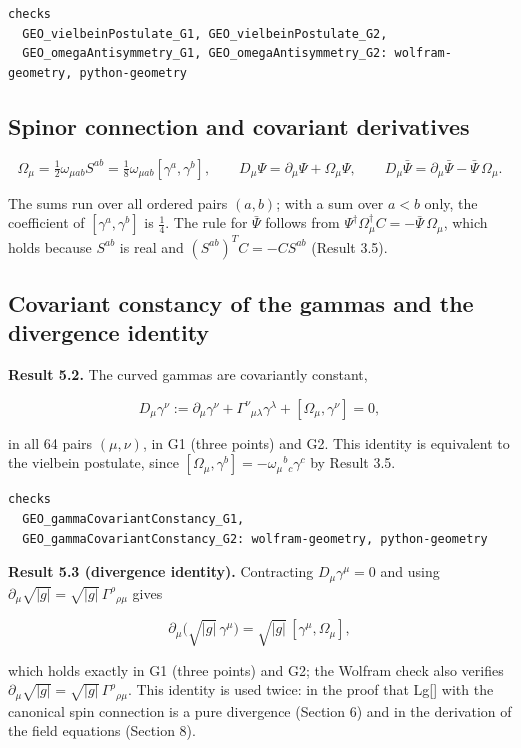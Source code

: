 \documentclass[11pt]{article}
\begin{document}
\begin{Verbatim}[fontsize=\small]
checks
  GEO_vielbeinPostulate_G1, GEO_vielbeinPostulate_G2,
  GEO_omegaAntisymmetry_G1, GEO_omegaAntisymmetry_G2: wolfram-geometry, python-geometry
\end{Verbatim}

\subsection{Spinor connection and covariant derivatives}

\[
\Omega_\mu=\tfrac12\omega_{\mu ab}S^{ab}=\tfrac18\omega_{\mu ab}[\gamma^a,\gamma^b],\qquad D_\mu\Psi=\partial_\mu\Psi+\Omega_\mu\Psi,\qquad D_\mu\bar\Psi=\partial_\mu\bar\Psi-\bar\Psi\,\Omega_\mu .
\]

The sums run over all ordered pairs $(a,b)$; with a sum over $a<b$ only, the coefficient of $[\gamma^a,\gamma^b]$ is $\tfrac14$. The rule for $\bar\Psi$ follows from $\Psi^\dagger\Omega_\mu^\dagger C=-\bar\Psi\,\Omega_\mu$, which holds because $S^{ab}$ is real and $(S^{ab})^TC=-CS^{ab}$ (Result 3.5).

\subsection{Covariant constancy of the gammas and the divergence identity}

\textbf{Result 5.2.} The curved gammas are covariantly constant,

\[
D_\mu\gamma^\nu:=\partial_\mu\gamma^\nu+\Gamma^\nu{}_{\mu\lambda}\gamma^\lambda+[\Omega_\mu,\gamma^\nu]=0,
\]

in all 64 pairs $(\mu,\nu)$, in G1 (three points) and G2. This identity is equivalent to the vielbein postulate, since $[\Omega_\mu,\gamma^b]=-\omega_\mu{}^b{}_c\gamma^c$ by Result 3.5.

\begin{Verbatim}[fontsize=\small]
checks
  GEO_gammaCovariantConstancy_G1,
  GEO_gammaCovariantConstancy_G2: wolfram-geometry, python-geometry
\end{Verbatim}

\textbf{Result 5.3 (divergence identity).} Contracting $D_\mu\gamma^\mu=0$ and using $\partial_\mu\sqrt{|g|}=\sqrt{|g|}\,\Gamma^\rho{}_{\rho\mu}$ gives

\[
\partial_\mu\bigl(\sqrt{|g|}\,\gamma^\mu\bigr)=\sqrt{|g|}\,[\gamma^\mu,\Omega_\mu],
\]

which holds exactly in G1 (three points) and G2; the Wolfram check also verifies $\partial_\mu\sqrt{|g|}=\sqrt{|g|}\,\Gamma^\rho{}_{\rho\mu}$. This identity is used twice: in the proof that Lg[] with the canonical spin connection is a pure divergence (Section 6) and in the derivation of the field equations (Section 8).
\end{document}
